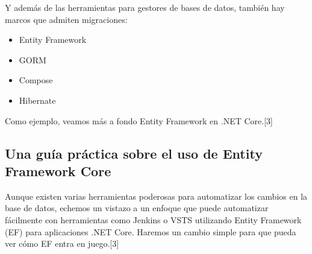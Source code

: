 \documentclass[twoside,twocolumn]{article}
\begin{document}
Y además de las herramientas para gestores de bases de datos, también hay marcos que admiten migraciones:

\begin{itemize}
\item Entity Framework
\item GORM
\item Compose
\item Hibernate
\end{itemize}

Como ejemplo, veamos más a fondo Entity Framework en .NET Core.[3]

\subsection{Una guía práctica sobre el uso de Entity Framework Core}
Aunque existen varias herramientas poderosas para automatizar los cambios en la base de datos, echemos un vistazo a un enfoque que puede automatizar fácilmente con herramientas como Jenkins o VSTS utilizando Entity Framework (EF) para aplicaciones .NET Core.
Haremos un cambio simple para que pueda ver cómo EF entra en juego.[3]
\end{document}
